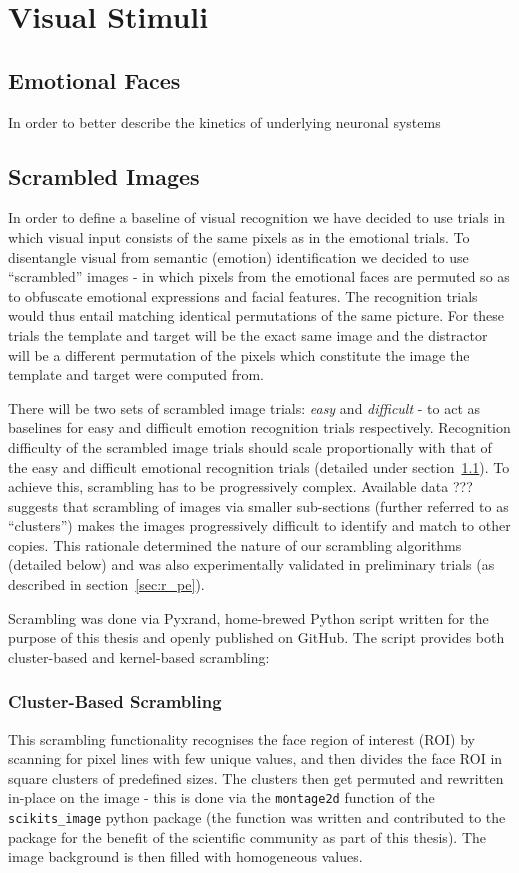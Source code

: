     \section{Visual Stimuli}
	\subsection{Emotional Faces}\label{sec:m_vs_ef}
	
	In order to better describe the kinetics of underlying neuronal systems 
	\subsection{Scrambled Images}\label{sec:m_vs_si}
	In order to define a baseline of visual recognition we have decided to use trials in which visual input consists of the same pixels as in the emotional trials. 
	To disentangle visual from semantic (emotion) identification we decided to use “scrambled” images - in which pixels from the emotional faces are permuted so as to obfuscate emotional expressions and facial features.
	The recognition trials would thus entail matching identical permutations of the same picture.
	For these trials the template and target will be the exact same image and the distractor will be a different permutation of the pixels which constitute the image the template and target were computed from. 
	
	There will be two sets of scrambled image trials: \textit{easy} and \textit{difficult} - to act as baselines for easy and difficult emotion recognition trials respectively.
	Recognition difficulty of the scrambled image trials should scale proportionally with that of the easy and difficult emotional recognition trials (detailed under section~\ref{sec:m_vs_ef}).
	To achieve this, scrambling has to be progressively complex.
	Available data ??? suggests that scrambling of images via smaller sub-sections (further referred to as “clusters”) makes the images progressively difficult to identify and match to other copies.
	This rationale determined the nature of our scrambling algorithms (detailed below) and was also experimentally validated in preliminary trials (as described in section~\ref{sec:r_pe}).
	
	Scrambling was done via Pyxrand\cite{pyxrand}, home-brewed Python script written for the purpose of this thesis and openly published on GitHub.
	The script provides both cluster-based and kernel-based scrambling:
	    \subsubsection{Cluster-Based Scrambling}
	    This scrambling functionality recognises the face region of interest (ROI) by scanning for pixel lines with few unique values, and then divides the face ROI in square clusters of predefined sizes.
	    The clusters then get permuted and rewritten in-place on the image - this is done via the \colorbox{vlg}{\texttt{montage2d}} function of the \colorbox{vlg}{\texttt{scikits\_image}} python package 
	    (the function was written and contributed to the package for the benefit of the scientific community as part of this thesis).
	    The image background is then filled with homogeneous values.
